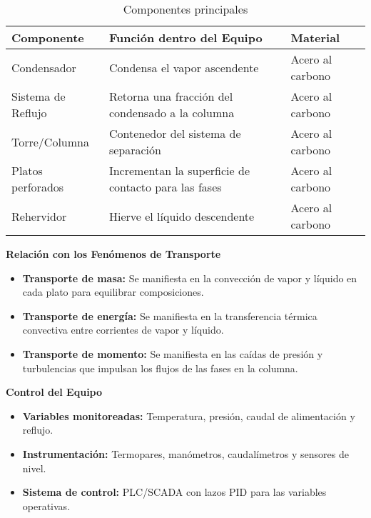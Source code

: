 \newpage
\begin{table}[ht]
    \centering
    \caption{Componentes principales}
    \begin{tabularx}{\linewidth}{|A{3.5cm}|B|B|}
        \hline
        \textbf{Componente} & \textbf{Función dentro del Equipo}                   & \textbf{Material} \\
        \hline
        Condensador         & Condensa el vapor ascendente                         & Acero al carbono  \\
        \hline
        Sistema de Reflujo  & Retorna una fracción del condensado a la columna     & Acero al carbono  \\
        \hline
        Torre/Columna       & Contenedor del sistema de separación                 & Acero al carbono  \\
        \hline
        Platos perforados   & Incrementan la superficie de contacto para las fases & Acero al carbono  \\
        \hline
        Rehervidor          & Hierve el líquido descendente                        & Acero al carbono  \\
        \hline
    \end{tabularx}
\end{table}

\textbf{Relación con los Fenómenos de Transporte} \\
\begin{itemize}
    \item \textbf{Transporte de masa:} Se manifiesta en la convección de vapor y líquido en cada plato para equilibrar composiciones.
    \item \textbf{Transporte de energía:} Se manifiesta en la transferencia térmica convectiva entre corrientes de vapor y líquido.
    \item \textbf{Transporte de momento:} Se manifiesta en las caídas de presión y turbulencias que impulsan los flujos de las fases en la columna.
\end{itemize}

\textbf{Control del Equipo} \\
\begin{itemize}
    \item \textbf{Variables monitoreadas:} Temperatura, presión, caudal de alimentación y reflujo.
    \item \textbf{Instrumentación:} Termopares, manómetros, caudalímetros y sensores de nivel.
    \item \textbf{Sistema de control:} PLC/SCADA con lazos PID para las variables operativas.
\end{itemize}

